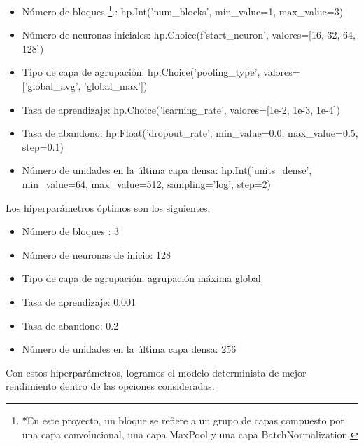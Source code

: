 \documentclass[10pt, oneside, a4paper]{article}
\begin{document}
	\begin{itemize}
		\item Número de bloques \footnote{\label{note1}*En este proyecto, un bloque se refiere a un grupo de capas compuesto por una capa convolucional, una capa MaxPool y una capa BatchNormalization.}.: hp.Int('num\_blocks', min\_value=1, max\_value=3)
		\item Número de neuronas iniciales: hp.Choice(f'start\_neuron', valores=[16, 32, 64, 128])
		\item Tipo de capa de agrupación: hp.Choice('pooling\_type', valores=['global\_avg', 'global\_max'])
		\item Tasa de aprendizaje: hp.Choice('learning\_rate', valores=[1e-2, 1e-3, 1e-4])
		\item Tasa de abandono: hp.Float('dropout\_rate', min\_value=0.0, max\_value=0.5, step=0.1)
		\item Número de unidades en la última capa densa: hp.Int('units\_dense', min\_value=64, max\_value=512, sampling='log', step=2)
		
	\end{itemize}
	
	Los hiperparámetros óptimos son los siguientes:

	\begin{itemize}
		\item Número de bloques : 3
		\item Número de neuronas de inicio: 128
		\item Tipo de capa de agrupación: agrupación máxima global
		\item Tasa de aprendizaje: 0.001
		\item Tasa de abandono: 0.2
		\item Número de unidades en la última capa densa: 256
	\end{itemize}

	Con estos hiperparámetros, logramos el modelo determinista de mejor rendimiento dentro de las opciones consideradas.
	
\begin{table}[H]
	\caption{Métricas Red Neuronal Determinista - Ventana W4}
	\label{tab:modelo_w4_v1}
\end{table}
\end{document}
